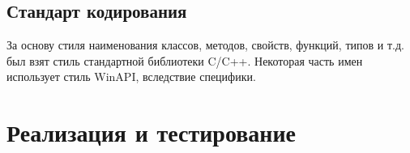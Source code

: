 \documentclass{imcs}
\begin{document}
\subsection{Стандарт кодирования}

За основу стиля наименования классов, методов, свойств, функций, типов и т.д. был взят стиль стандартной библиотеки C/C++. Некоторая часть имен использует стиль WinAPI, вследствие специфики.

\section{Реализация и тестирование}
\end{document}

